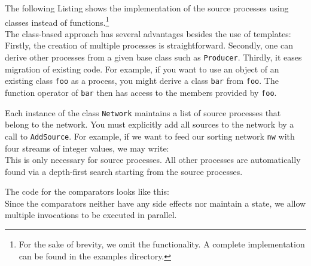 The following Listing shows the implementation of the source processes using classes instead of functions.\footnote{For the sake of brevity, we omit the functionality. A complete implementation can be found in the examples directory.}
%
\\
%
The class-based approach has several advantages besides the use of templates: Firstly, the creation of multiple processes is straightforward. Secondly, one can derive other processes from a given base class such as \lstinline|Producer|. Thirdly, it eases migration of existing code. For example, if you want to use an object of an existing class \lstinline|foo| as a process, you might derive a class \lstinline|bar| from \lstinline|foo|. The function operator of \lstinline|bar| then has access to the members provided by \lstinline|foo|.

Each instance of the class \lstinline|Network| maintains a list of source processes that belong to the network.
You must explicitly add all sources to the network by a call to \lstinline|AddSource|. For example, if we want to feed our sorting network \lstinline|nw| with four streams of integer values, we may write:
%
\\
%
This is only necessary for source processes. All other processes are automatically found via a depth-first search starting from the source processes.

The code for the comparators looks like this:
%
\\
%
Since the comparators neither have any side effects nor maintain a state, we allow multiple invocations to be executed in parallel.

